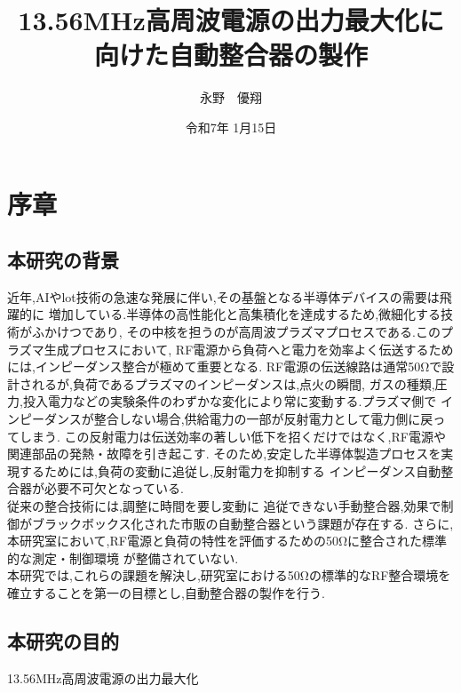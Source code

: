 \documentclass[uplatex, 12pt]{ujbook}
\title{13.56MHz高周波電源の出力最大化に向けた自動整合器の製作}
\author{永野　優翔}
\date{令和7年 1月15日}
\begin{document}
\maketitle                    %
\cleardoublepageskip          %
\tableofcontents              %
\listoffigures                %
\listoftables                 %
\cleardoublepageskip          %
\newpage

\chapter{序章}

\section{本研究の背景}
 近年,AIやlot技術の急速な発展に伴い,その基盤となる半導体デバイスの需要は飛躍的に
 増加している.半導体の高性能化と高集積化を達成するため,微細化する技術がふかけつであり,
 その中核を担うのが高周波プラズマプロセスである.このプラズマ生成プロセスにおいて,
 RF電源から負荷へと電力を効率よく伝送するためには,インピーダンス整合が極めて重要となる.
 RF電源の伝送線路は通常50Ωで設計されるが,負荷であるプラズマのインピーダンスは,点火の瞬間,
ガスの種類,圧力,投入電力などの実験条件のわずかな変化により常に変動する.プラズマ側で
インピーダンスが整合しない場合,供給電力の一部が反射電力として電力側に戻ってしまう.
この反射電力は伝送効率の著しい低下を招くだけではなく,RF電源や関連部品の発熱・故障を引き起こす.
そのため,安定した半導体製造プロセスを実現するためには,負荷の変動に追従し,反射電力を抑制する
インピーダンス自動整合器が必要不可欠となっている.\\従来の整合技術には,調整に時間を要し変動に
追従できない手動整合器,効果で制御がブラックボックス化された市販の自動整合器という課題が存在する.
さらに,本研究室において,RF電源と負荷の特性を評価するための50Ωに整合された標準的な測定・制御環境
が整備されていない.\\ 
本研究では,これらの課題を解決し,研究室における50Ωの標準的なRF整合環境を
確立することを第一の目標とし,自動整合器の製作を行う.

\section{本研究の目的}
 13.56MHz高周波電源の出力最大化
\end{document}
